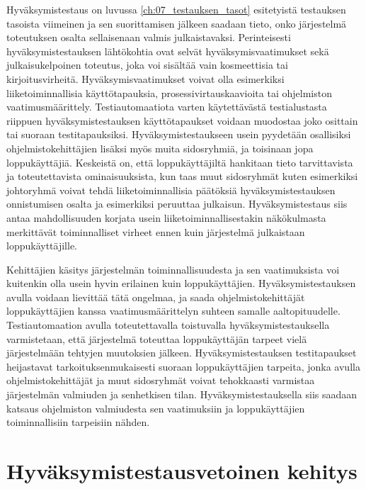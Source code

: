   Hyväksymistestaus on luvussa \ref{ch:07_testauksen_tasot} esitetyistä testauksen tasoista viimeinen ja sen suorittamisen jälkeen saadaan tieto, onko järjestelmä toteutuksen osalta sellaisenaan valmis julkaistavaksi.
  Perinteisesti hyväksymistestauksen lähtökohtia ovat selvät hyväksymisvaatimukset sekä julkaisukelpoinen toteutus, joka voi sisältää vain kosmeettisia tai kirjoitusvirheitä.
  Hyväksymisvaatimukset voivat olla esimerkiksi liiketoiminnallisia käyttötapauksia, prosessivirtauskaavioita tai ohjelmiston vaatimusmäärittely.
  Testiautomaatiota varten käytettävästä testialustasta riippuen hyväksymistestauksen käyttötapaukset voidaan muodostaa joko osittain tai suoraan testitapauksiksi.
  Hyväksymistestaukseen usein pyydetään osallisiksi ohjelmistokehittäjien lisäksi myös muita sidosryhmiä, ja toisinaan jopa loppukäyttäjiä.
  Keskeistä on, että loppukäyttäjiltä hankitaan tieto tarvittavista ja toteutettavista ominaisuuksista, kun taas muut sidosryhmät kuten esimerkiksi johtoryhmä voivat tehdä liiketoiminnallisia päätöksiä hyväksymistestauksen onnistumisen osalta ja esimerkiksi peruuttaa julkaisun.
  Hyväksymistestaus siis antaa mahdollisuuden korjata usein liiketoiminnallisestakin näkökulmasta merkittävät toiminnalliset virheet ennen kuin järjestelmä julkaistaan loppukäyttäjille.

  Kehittäjien käsitys järjestelmän toiminnallisuudesta ja sen vaatimuksista voi kuitenkin olla usein hyvin erilainen kuin loppukäyttäjien.
  Hyväksymistestauksen avulla voidaan lievittää tätä ongelmaa, ja saada ohjelmistokehittäjät loppukäyttäjien kanssa vaatimusmäärittelyn suhteen samalle aaltopituudelle.
  Testiautomaation avulla toteutettavalla toistuvalla hyväksymistestauksella varmistetaan, että järjestelmä toteuttaa loppukäyttäjän tarpeet vielä järjestelmään tehtyjen muutoksien jälkeen.
  Hyväksymistestauksen testitapaukset heijastavat tarkoituksenmukaisesti suoraan loppukäyttäjien tarpeita, jonka avulla ohjelmistokehittäjät ja muut sidosryhmät voivat tehokkaasti varmistaa järjestelmän valmiuden ja senhetkisen tilan.
  Hyväksymistestauksella siis saadaan katsaus ohjelmiston valmiudesta sen vaatimuksiin ja loppukäyttäjien toiminnallisiin tarpeisiin nähden.

\section{Hyväksymistestausvetoinen kehitys} \label{ch:08_hyvaksymistestausvetoinen_kehitys}


